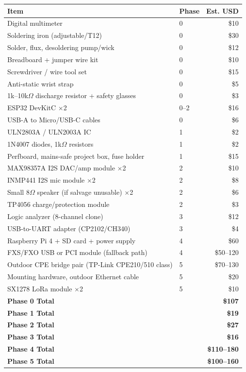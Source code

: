 \vspace{0.2cm}
\noindent
\begin{tabular}{@{}p{6cm} p{2cm} r@{}}
\toprule
\textbf{\color{arliznavy}Item} & \textbf{\color{arligray}Phase} & \textbf{\color{arlizblue}Est. USD} \\
\midrule
Digital multimeter & 0 & \$10 \\
Soldering iron (adjustable/T12) & 0 & \$30 \\
Solder, flux, desoldering pump/wick & 0 & \$12 \\
Breadboard + jumper wire kit & 0 & \$10 \\
Screwdriver / wire tool set & 0 & \$15 \\
Anti-static wrist strap & 0 & \$5 \\
1k--10k$\Omega$ discharge resistor + safety glasses & 0 & \$3 \\
\midrule
ESP32 DevKitC $\times$2 & 0--2 & \$16 \\
USB-A to Micro/USB-C cables & 0 & \$6 \\
\midrule
ULN2803A / ULN2003A IC & 1 & \$2 \\
1N4007 diodes, 1k$\Omega$ resistors & 1 & \$2 \\
Perfboard, mains-safe project box, fuse holder & 1 & \$15 \\
\midrule
MAX98357A I2S DAC/amp module $\times$2 & 2 & \$10 \\
INMP441 I2S mic module $\times$2 & 2 & \$8 \\
Small 8$\Omega$ speaker (if salvage unusable) $\times$2 & 2 & \$6 \\
TP4056 charge/protection module & 2 & \$3 \\
\midrule
Logic analyzer (8-channel clone) & 3 & \$12 \\
USB-to-UART adapter (CP2102/CH340) & 3 & \$4 \\
\midrule
Raspberry Pi 4 + SD card + power supply & 4 & \$60 \\
FXS/FXO USB or PCI module (fallback path) & 4 & \$50--120 \\
\midrule
Outdoor CPE bridge pair (TP-Link CPE210/510 class) & 5 & \$70--130 \\
Mounting hardware, outdoor Ethernet cable & 5 & \$20 \\
SX1278 LoRa module $\times$2 & 5 & \$10 \\
\midrule
\textbf{Phase 0 Total} & & \textbf{\$107} \\
\textbf{Phase 1 Total} & & \textbf{\$19} \\
\textbf{Phase 2 Total} & & \textbf{\$27} \\
\textbf{Phase 3 Total} & & \textbf{\$16} \\
\textbf{Phase 4 Total} & & \textbf{\$110--180} \\
\textbf{Phase 5 Total} & & \textbf{\$100--160} \\
\bottomrule
\end{tabular}

